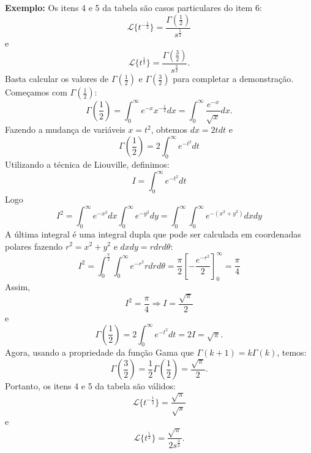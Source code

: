 \documentclass[a4paper,10pt]{book}
\begin{document}
{\bf Exemplo: } Os itens 4 e 5 da tabela são casos particulares do item 6:
 \begin{equation}
 \mathcal{L}\{t^{-\frac{1}{2}}\}=\frac{\Gamma\left(\frac{1}{2}\right)}{s^{\frac{1}{2}}}
 \end{equation}
e
 \begin{equation}
 \mathcal{L}\{t^{\frac{1}{2}}\}=\frac{\Gamma\left(\frac{3}{2}\right)}{s^{\frac{3}{2}}}.
 \end{equation}
 Basta calcular os valores de $\Gamma\left(\frac{1}{2}\right)$ e $\Gamma\left(\frac{3}{2}\right)$ para completar a demonstração. Começamos com $\Gamma\left(\frac{1}{2}\right)$:
 \begin{equation}
 \Gamma\left(\frac{1}{2}\right)=\int_0^\infty e^{-x}x^{-\frac{1}{2}}dx=\int_0^\infty \frac{e^{-x}}{\sqrt{x}}dx.
 \end{equation}
 Fazendo a mudança de variáveis $x=t^{2}$, obtemos $dx=2tdt$ e
\begin{equation}\Gamma\left(\frac{1}{2}\right)=2\int_{0}^{\infty}e^{-t^2}dt
\end{equation}
Utilizando a técnica de Liouville, definimos:
\begin{equation}
I=\int_{0}^{\infty}e^{-t^2}dt
\end{equation}
Logo
\begin{equation}
I^2=\int_{0}^{\infty}e^{-x^2}dx\int_{0}^{\infty}e^{-y^2}dy=\int_{0}^{\infty}\int_{0}^{\infty}e^{-(x^2+y^2)}dx dy
\end{equation}
A última integral é uma integral dupla que pode ser calculada em coordenadas polares fazendo $r^2=x^2+y^2$ e $dxdy=rdrd\theta$:
\begin{equation}
I^2=\int_{0}^{\frac{\pi}{2}}\int_{0}^{\infty}e^{-r^2}rdr d{\theta}=\frac{\pi}{2}\left[-\frac{e^{-r^2}}{2}\right]_0^\infty=\frac{\pi}{4}
\end{equation}
Assim,
\begin{equation}
I^2=\frac{\pi}{4}\Rightarrow I=\frac{\sqrt{\pi}}{2}
\end{equation}
e
\begin{equation}
\Gamma\left(\frac{1}{2}\right)=2\int_{0}^{\infty}e^{-t^2}dt=2I=\sqrt{\pi}.
\end{equation}
Agora, usando a propriedade da função Gama que $\Gamma(k+1)=k\Gamma(k)$, temos:
\begin{equation}
\Gamma\left(\frac{3}{2}\right)=\frac{1}{2}\Gamma\left(\frac{1}{2}\right)=\frac{\sqrt{\pi}}{2}.
\end{equation}
Portanto, os itens 4 e 5 da tabela são válidos:
\begin{equation}
 \mathcal{L}\{t^{-\frac{1}{2}}\}=\frac{\sqrt{\pi}}{\sqrt{s}}
\end{equation}
e
\begin{equation}
 \mathcal{L}\{t^{\frac{1}{2}}\}=\frac{\sqrt{\pi}}{2s^{\frac{3}{2}}}.
\end{equation}
 
\end{document}
